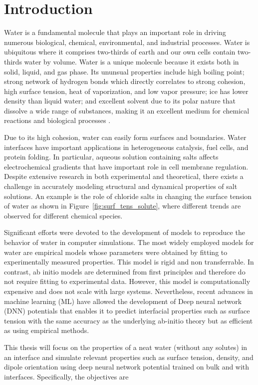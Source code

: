 \chapter{Introduction}
Water is a fundamental molecule that plays an important role  in driving
numerous biological, chemical, environmental, and industrial processes. Water
is ubiquitous where it comprises two-thirds of earth and our own cells contain
two-thirds water by volume. Water is a unique molecule because it exists both
in
solid, liquid, and gas phase. Its ununsual properties include high boiling
point;
strong network of hydrogen bonds which directly correlates to  strong cohesion,
high surface
tension, heat of vaporization, and low vapor
pressure; ice has lower density than liquid water; and excellent solvent due to
its polar nature that
dissolve a wide range of substances, making it an excellent medium for chemical
reactions and biological processes \cite{Kontogeorgis2022}.

Due to its high cohesion, water can easily form surfaces and boundaries. Water
interfaces have important applications in heterogeneous catalysis, fuel cells,
and protein folding. In particular, aqueous solution containing salts affects
electrochemical gradients  that have important role in	cell membrane
regulation. Despite extensive research in both experimental and theoretical,
there exists a challenge in accurately modeling structural and dynamical
properties of salt solutions. An example is the role of chloride salts in
changing the surface tension of water as shown in
Figure~\ref{fig:surf_tens_solute}, where different trends are observed for
different chemical species.

Significant efforts were devoted to the development of models to reproduce the
behavior of water in computer simulations. The most
widely employed models for water are empirical models whose
parameters were obtained by fitting to experimentally measured properties. This
model is rigid and non transferrable. In contrast, ab initio models are
determined from first principles and
therefore do not require fitting to experimental data. However, this model is
computationally expensive and does not scale with large systems. Nevertheless,
recent advances in machine learning (ML) have allowed the development of Deep
neural network (DNN) potentials that
enables it to predict interfacial properties such as surface tension with the
same accuracy as the underlying ab-initio theory but as efficient as using
empirical methods.

This thesis will focus on the properties of a neat water (without any
solutes) in an interface and simulate relevant properties such as surface
tension, density, and dipole orientation using deep neural network potential
trained on bulk and with interfaces. Specifically, the objectives are

